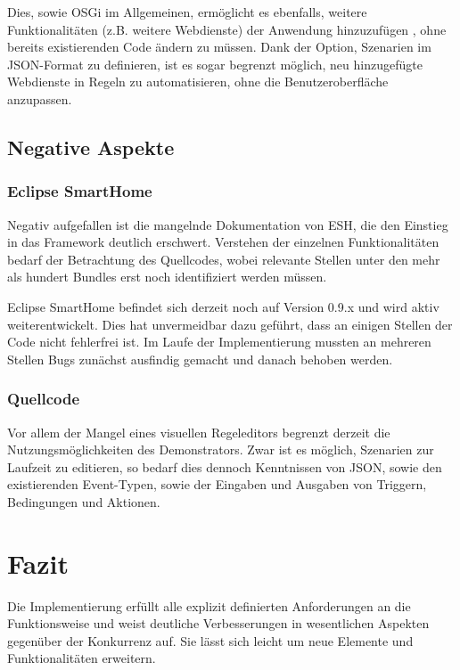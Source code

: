 Dies, sowie OSGi im Allgemeinen, ermöglicht es ebenfalls, weitere Funktionalitäten (z.B. weitere Webdienste) der Anwendung hinzuzufügen , ohne bereits existierenden Code ändern zu müssen. Dank der Option, Szenarien im JSON-Format zu definieren, ist es sogar begrenzt möglich, neu hinzugefügte Webdienste in Regeln zu automatisieren, ohne die Benutzeroberfläche anzupassen.

\subsection{Negative Aspekte}
\subsubsection{Eclipse SmartHome}
Negativ aufgefallen ist die mangelnde Dokumentation von ESH, die den Einstieg in das Framework deutlich erschwert. Verstehen der einzelnen Funktionalitäten bedarf der Betrachtung des Quellcodes, wobei relevante Stellen unter den mehr als hundert Bundles erst noch identifiziert werden müssen. 

Eclipse SmartHome befindet sich derzeit noch auf Version 0.9.x und wird aktiv weiterentwickelt. Dies hat unvermeidbar dazu geführt, dass an einigen Stellen der Code nicht fehlerfrei ist. Im Laufe der Implementierung mussten an mehreren Stellen Bugs zunächst ausfindig gemacht und danach behoben werden.

\subsubsection{Quellcode}
Vor allem der Mangel eines visuellen Regeleditors begrenzt derzeit die Nutzungsmöglichkeiten des Demonstrators. Zwar ist es möglich, Szenarien zur Laufzeit zu editieren, so bedarf dies dennoch Kenntnissen von JSON, sowie den existierenden Event-Typen, sowie der Eingaben und Ausgaben von Triggern, Bedingungen und Aktionen.

\section{Fazit}
Die Implementierung erfüllt alle explizit definierten Anforderungen an die Funktionsweise und weist deutliche Verbesserungen in wesentlichen Aspekten gegenüber der Konkurrenz auf. Sie lässt sich leicht um neue Elemente und Funktionalitäten erweitern.

